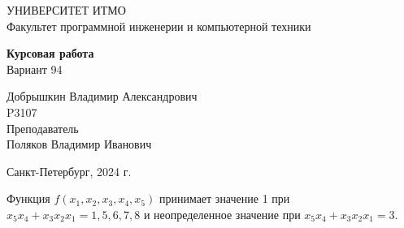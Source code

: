 \documentclass{article}
\begin{document}
\begin{center}
    \Large{УНИВЕРСИТЕТ ИТМО \\
    Факультет программной инженерии и компьютерной техники}
    
    \vspace{5cm}

    \Large{\textbf{Курсовая работа} \\
    Вариант 94}
\end{center}

\vspace{2cm}

\hfill\begin{minipage}{0.35\linewidth}
Добрышкин Владимир Александрович \\
P3107 \\

Преподаватель \\
Поляков Владимир Иванович
\end{minipage}

\vfill

\begin{center}
    Санкт-Петербург, 2024 г.
\end{center}

\thispagestyle{empty}
\newpage

Функция $f(x_1, x_2, x_3, x_4, x_5)$ принимает значение 1 при $x_5 x_4 + x_3 x_2 x_1 = 1, 5, 6, 7, 8$ и неопределенное значение при $x_5 x_4 + x_3 x_2 x_1 = 3$.
\end{document}
